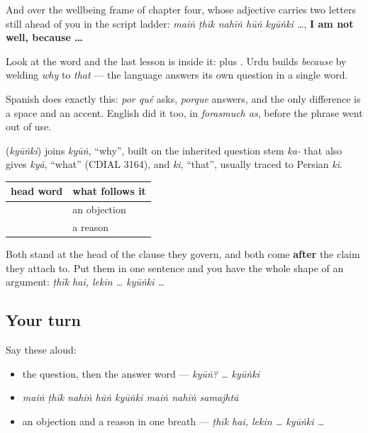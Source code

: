And over the wellbeing frame of chapter four, whose adjective carries two letters still ahead of you in the script ladder: \emph{maiṅ ṭhīk nahīṅ hūṅ kyūṅki …}, \textbf{I am not well, because …}

Look at the word and the last lesson is inside it: \textbf{} plus \textbf{}. Urdu builds \emph{because} by welding \emph{why} to \emph{that} — the language answers its own question in a single word.

Spanish does exactly this: \emph{por qué} asks, \emph{porque} answers, and the only difference is a space and an accent. English did it too, in \emph{forasmuch as}, before the phrase went out of use.

\begin{cousinweb}
\textbf{} (\emph{kyūṅki}) joins \emph{kyūṅ}, \textquotedblleft{}why\textquotedblright{}, built on the inherited question stem \emph{ka-} that also gives \emph{kyā}, \textquotedblleft{}what\textquotedblright{} (CDIAL 3164), and \emph{ki}, \textquotedblleft{}that\textquotedblright{}, usually traced to Persian \emph{ki}.
\end{cousinweb}

\begin{grammarlens}[title={Grammar Lens: claim first, reason after}]
\noindent
\begin{tabularx}{\linewidth}{@{}>{\raggedright\arraybackslash}X>{\raggedright\arraybackslash}X@{}}
\toprule
\textbf{head word} & \textbf{what follows it} \\
\midrule
\textbf{\ur{لیکن}} & an objection \\
\textbf{\ur{کیونکہ}} & a reason \\
\bottomrule
\end{tabularx}

Both stand at the head of the clause they govern, and both come \textbf{after} the claim they attach to. Put them in one sentence and you have the whole shape of an argument: \emph{ṭhīk hai, lekin … kyūṅki …}
\end{grammarlens}

\subsection*{Your turn}
Say these aloud:

\begin{itemize}
\raggedright
  \item the question, then the answer word — \emph{kyūṅ? … kyūṅki}
  \item \emph{maiṅ ṭhīk nahīṅ hūṅ kyūṅki maiṅ nahīṅ samajhtā}
  \item an objection and a reason in one breath — \emph{ṭhīk hai, lekin … kyūṅki …}
\end{itemize}

